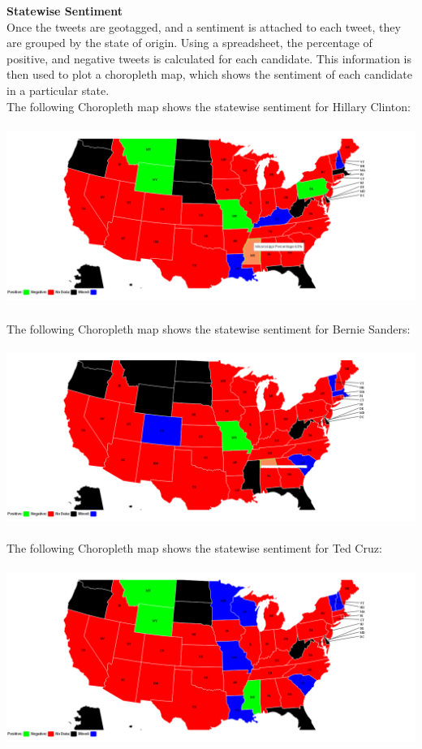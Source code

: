 \documentclass[twoside]{article}
\begin{document}
\begin{multicols}{2}
\textbf{Statewise Sentiment} \\
Once the tweets are geotagged, and a sentiment is attached to each tweet, they are grouped by the state of origin. Using a spreadsheet, the percentage of positive, and negative tweets is calculated for each candidate. This information is then used to plot a choropleth map, which shows the sentiment of each candidate in a particular state. \\

The following Choropleth map shows the statewise sentiment for Hillary Clinton: \\ \\
\includegraphics[width=1\columnwidth]{clinton-chor} \\ \\
The following Choropleth map shows the statewise sentiment for Bernie Sanders: \\ \\
\includegraphics[width=1\columnwidth]{sanders-chor} \\ \\
The following Choropleth map shows the statewise sentiment for Ted Cruz: \\ \\
\includegraphics[width=1\columnwidth]{cruz-chor} \\ \\

\end{multicols}
\end{document}
